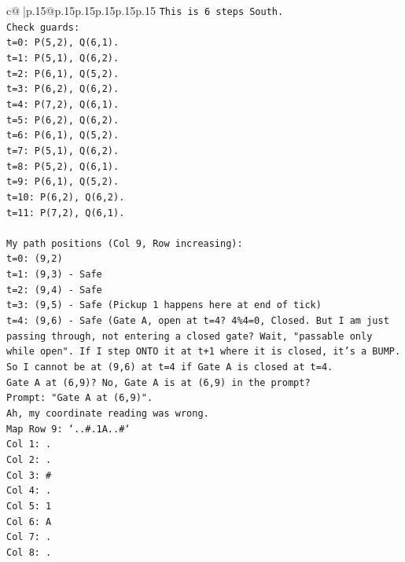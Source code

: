 \documentclass{article}
\begin{document}
{\begin{supertabular}{c@{$\;$}|p{.15\linewidth}@{}p{.15\linewidth}p{.15\linewidth}p{.15\linewidth}p{.15\linewidth}p{.15\linewidth}}
{{{\texttt{This is 6 steps South.} \\
\texttt{Check guards:} \\
\texttt{t=0: P(5,2), Q(6,1).} \\
\texttt{t=1: P(5,1), Q(6,2).} \\
\texttt{t=2: P(6,1), Q(5,2).} \\
\texttt{t=3: P(6,2), Q(6,2).} \\
\texttt{t=4: P(7,2), Q(6,1).} \\
\texttt{t=5: P(6,2), Q(6,2).} \\
\texttt{t=6: P(6,1), Q(5,2).} \\
\texttt{t=7: P(5,1), Q(6,2).} \\
\texttt{t=8: P(5,2), Q(6,1).} \\
\texttt{t=9: P(6,1), Q(5,2).} \\
\texttt{t=10: P(6,2), Q(6,2).} \\
\texttt{t=11: P(7,2), Q(6,1).} \\
\\ 
\texttt{My path positions (Col 9, Row increasing):} \\
\texttt{t=0: (9,2)} \\
\texttt{t=1: (9,3) {-} Safe} \\
\texttt{t=2: (9,4) {-} Safe} \\
\texttt{t=3: (9,5) {-} Safe (Pickup 1 happens here at end of tick)} \\
\texttt{t=4: (9,6) {-} Safe (Gate A, open at t=4? 4\%4=0, Closed. But I am just passing through, not entering a closed gate? Wait, "passable only while open". If I step ONTO it at t+1 where it is closed, it's a BUMP. So I cannot be at (9,6) at t=4 if Gate A is closed at t=4.} \\
\texttt{Gate A at (6,9)? No, Gate A is at (6,9) in the prompt?} \\
\texttt{Prompt: "Gate A at (6,9)".} \\
\texttt{Ah, my coordinate reading was wrong.} \\
\texttt{Map Row 9: `..\#.1A..\#`} \\
\texttt{Col 1: .} \\
\texttt{Col 2: .} \\
\texttt{Col 3: \#} \\
\texttt{Col 4: .} \\
\texttt{Col 5: 1} \\
\texttt{Col 6: A} \\
\texttt{Col 7: .} \\
\texttt{Col 8: .} \\
}}}
\end{supertabular}}
\end{document}
